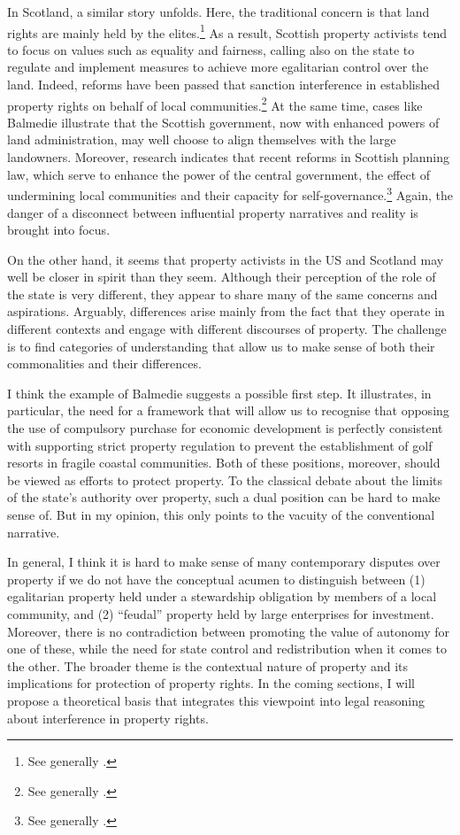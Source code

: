 In Scotland, a similar story unfolds. Here, the traditional concern is that land rights are mainly held by the elites.\footnote{See generally \cite{wightman96,wightman13}.} As a result, Scottish property activists tend to focus on values such as equality and fairness, calling also on the state to regulate and implement measures to achieve more egalitarian control over the land. Indeed, reforms have been passed that sanction interference in established property rights on behalf of local communities.\footnote{See generally \cite{lovett11,hoffman13}.} At the same time, cases like Balmedie illustrate that the Scottish government, now with enhanced powers of land administration, may well choose to align themselves with the large landowners. Moreover, research indicates that recent reforms in Scottish planning law, which serve to enhance the power of the central government,  the effect of undermining local communities and their capacity for self-governance.\footnote{See generally \cite{pacione13,pacione14}.} Again, the danger of a disconnect between influential property narratives and reality is brought into focus.

On the other hand, it seems that  property activists in the US and Scotland may well be closer in spirit than they seem. Although their perception of the role of the state is very different, they appear to share many of the same concerns and aspirations. Arguably, differences arise mainly from the fact that they operate in different contexts and engage with different discourses of property. The challenge is to find categories of understanding that allow us to make sense of both their commonalities and their differences.

I think the example of Balmedie suggests a possible first step. It illustrates, in particular, the need for a framework that will allow us to recognise that opposing the use of compulsory purchase for economic development is perfectly consistent with supporting strict property regulation to prevent the establishment of golf resorts in fragile coastal communities. Both of these positions, moreover, should be viewed as efforts to protect property. To the classical debate about the limits of the state's authority over property, such a dual position can be hard to make sense of. But in my opinion, this only points to the vacuity of the conventional narrative.

In general, I think it is hard to make sense of many contemporary disputes over property if we do not have the conceptual acumen to distinguish between (1) egalitarian property held under a stewardship obligation by members of a local community, and (2) ``feudal'' property held by large enterprises for investment. Moreover, there is no contradiction between promoting the value of autonomy for one of these, while  the need for state control and redistribution when it comes to the other. The broader theme is the contextual nature of property and its implications for protection of property rights. In the coming sections, I will propose a theoretical basis that integrates this viewpoint into legal reasoning about interference in property rights.

